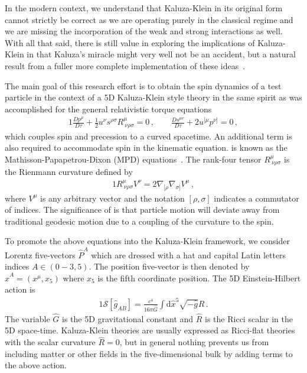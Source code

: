 In the modern context, we understand that Kaluza-Klein in its original form cannot strictly be correct as we are operating purely in the classical regime and we are missing the incorporation of the weak and strong interactions as well. With all that said, there is still value in exploring the implications of Kaluza-Klein in that Kaluza's miracle might very well not be an accident, but a natural result from a fuller more complete implementation of these ideas~\citep{Overduin:1997sri}.

The main goal of this research effort is to obtain the spin dynamics of a test particle in the context of a 5D Kaluza-Klein style theory in the same spirit as was accomplished for the general relativistic torque equations
\begin{alignat}{1}
  \label{STRESS06} \frac{Dp^{\mu}}{D\tau}+\frac{1}{2}u^{\nu}s^{\rho\sigma}R^{\mu}_{\ \nu\rho\sigma}=0\,,\qquad
  \frac{Ds^{\mu\nu}}{D\tau}+2u^{[\mu}p^{\nu]}=0\,,
\end{alignat}
which couples spin and precession to a curved spacetime. An additional term is also required to accommodate spin in the kinematic equation.  is known as the Mathisson-Papapetrou-Dixon (MPD) equations~\citep{Mathisson:1937zz,Papapetrou:1951pa,Dixon:1970zza,Mathisson:2010opl}. The rank-four tensor $R^{\mu}_{\ \nu\rho\sigma}$ is the Rienmann curvature defined by
\begin{alignat}{1}
  \label{STRESS08} R^{\mu}_{\ \nu\rho\sigma}V^{\nu}=2\nabla_{[\rho}\nabla_{\sigma]}V^{\mu}\,,
\end{alignat}
where $V^{\mu}$ is any arbitrary vector and the notation $[\rho,\sigma]$ indicates a commutator of indices. The significance of  is that particle motion will deviate away from traditional geodesic motion due to a coupling of the curvature to the spin.

To promote the above equations into the Kaluza-Klein framework, we consider Lorentz five-vectors $\hat{P}^{A}$ which are dressed with a hat and capital Latin letters indices $A\in(0-3,5)$. The position five-vector is then denoted by $\hat{x}^{A}=(x^{\mu},x_{5})$ where $x_{5}$ is the fifth coordinate position. The 5D Einstein-Hilbert action is
\begin{alignat}{1}
	\label{KALUZA01} \mathcal{S}[\hat{g}_{AB}]=\frac{c^{4}}{16\pi\hat{G}}\int\mathrm{d}\hat{x}^{5}\sqrt{-\hat{g}}\hat{R}\,.
\end{alignat}
The variable $\hat{G}$ is the 5D gravitational constant and $\hat{R}$ is the Ricci scalar in the 5D space-time. Kaluza-Klein theories are usually expressed as Ricci-flat theories with the scalar curvature $\hat{R}=0$, but in general nothing prevents us from including matter or other fields in the five-dimensional bulk by adding terms to the above action.

